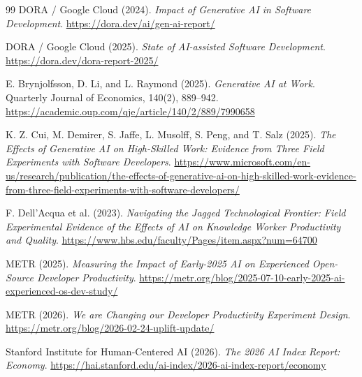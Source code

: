 \documentclass[11pt]{article}
\begin{document}
\begin{thebibliography}{99}
DORA / Google Cloud (2024).
\emph{Impact of Generative AI in Software Development}.
\url{https://dora.dev/ai/gen-ai-report/}

DORA / Google Cloud (2025).
\emph{State of AI-assisted Software Development}.
\url{https://dora.dev/dora-report-2025/}

E. Brynjolfsson, D. Li, and L. Raymond (2025).
\emph{Generative AI at Work}.
Quarterly Journal of Economics, 140(2), 889--942.
\url{https://academic.oup.com/qje/article/140/2/889/7990658}

K. Z. Cui, M. Demirer, S. Jaffe, L. Musolff, S. Peng, and T. Salz (2025).
\emph{The Effects of Generative AI on High-Skilled Work: Evidence from Three Field Experiments with Software Developers}.
\url{https://www.microsoft.com/en-us/research/publication/the-effects-of-generative-ai-on-high-skilled-work-evidence-from-three-field-experiments-with-software-developers/}

F. Dell'Acqua et al. (2023).
\emph{Navigating the Jagged Technological Frontier: Field Experimental Evidence of the Effects of AI on Knowledge Worker Productivity and Quality}.
\url{https://www.hbs.edu/faculty/Pages/item.aspx?num=64700}

METR (2025).
\emph{Measuring the Impact of Early-2025 AI on Experienced Open-Source Developer Productivity}.
\url{https://metr.org/blog/2025-07-10-early-2025-ai-experienced-os-dev-study/}

METR (2026).
\emph{We are Changing our Developer Productivity Experiment Design}.
\url{https://metr.org/blog/2026-02-24-uplift-update/}

Stanford Institute for Human-Centered AI (2026).
\emph{The 2026 AI Index Report: Economy}.
\url{https://hai.stanford.edu/ai-index/2026-ai-index-report/economy}

\end{thebibliography}
\end{document}
